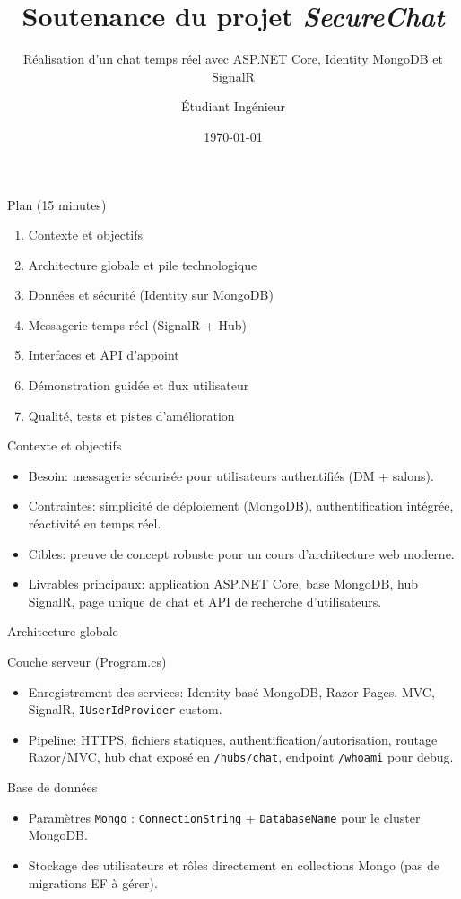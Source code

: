 \documentclass[10pt]{beamer}
\title{Soutenance du projet \textit{SecureChat}}
\subtitle{Réalisation d'un chat temps réel avec ASP.NET Core, Identity MongoDB et SignalR}
\author{Étudiant Ingénieur}
\date{\today}
\begin{document}
\begin{frame}
  \titlepage
\end{frame}

\begin{frame}{Plan (15 minutes)}
  \begin{enumerate}
    \item Contexte et objectifs
    \item Architecture globale et pile technologique
    \item Données et sécurité (Identity sur MongoDB)
    \item Messagerie temps réel (SignalR + Hub)
    \item Interfaces et API d'appoint
    \item Démonstration guidée et flux utilisateur
    \item Qualité, tests et pistes d'amélioration
  \end{enumerate}
\end{frame}

\begin{frame}{Contexte et objectifs}
  \begin{itemize}
    \item Besoin: messagerie sécurisée pour utilisateurs authentifiés (DM + salons).
    \item Contraintes: simplicité de déploiement (MongoDB), authentification intégrée, réactivité en temps réel.
    \item Cibles: preuve de concept robuste pour un cours d'architecture web moderne.
    \item Livrables principaux: application ASP.NET Core, base MongoDB, hub SignalR, page unique de chat et API de recherche d'utilisateurs.
  \end{itemize}
\end{frame}

\begin{frame}{Architecture globale}
  \begin{block}{Couche serveur (Program.cs)}
    \begin{itemize}
      \item Enregistrement des services: Identity basé MongoDB, Razor Pages, MVC, SignalR, \texttt{IUserIdProvider} custom.
      \item Pipeline: HTTPS, fichiers statiques, authentification/autorisation, routage Razor/MVC, hub chat exposé en \texttt{/hubs/chat}, endpoint \texttt{/whoami} pour debug.
    \end{itemize}
  \end{block}
  \begin{block}{Base de données}
    \begin{itemize}
      \item Paramètres \texttt{Mongo} : \texttt{ConnectionString} + \texttt{DatabaseName} pour le cluster MongoDB.
      \item Stockage des utilisateurs et rôles directement en collections Mongo (pas de migrations EF à gérer).
    \end{itemize}
  \end{block}
\end{frame}
\end{document}
